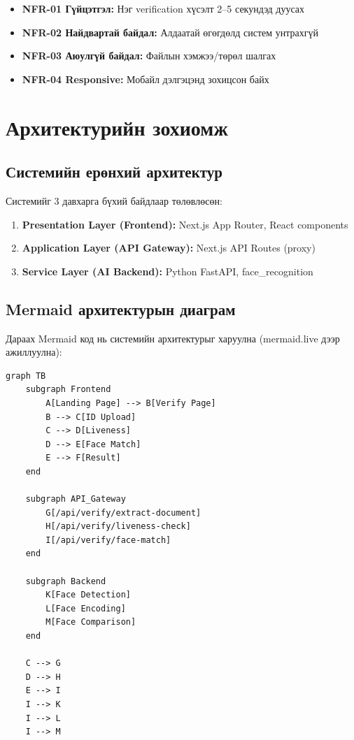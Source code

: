 \documentclass[12pt,a4paper]{article}
\begin{document}
\begin{itemize}[leftmargin=1cm]
  \item \textbf{NFR-01 Гүйцэтгэл:} Нэг verification хүсэлт 2--5 секундэд дуусах
  \item \textbf{NFR-02 Найдвартай байдал:} Алдаатай өгөгдөлд систем унтрахгүй
  \item \textbf{NFR-03 Аюулгүй байдал:} Файлын хэмжээ/төрөл шалгах
  \item \textbf{NFR-04 Responsive:} Мобайл дэлгэцэнд зохицсон байх
\end{itemize}

\section{Архитектурийн зохиомж}

\subsection{Системийн ерөнхий архитектур}

Системийг 3 давхарга бүхий байдлаар төлөвлөсөн:

\begin{enumerate}[leftmargin=1.2cm]
  \item \textbf{Presentation Layer (Frontend):} Next.js App Router, React components
  \item \textbf{Application Layer (API Gateway):} Next.js API Routes (proxy)
  \item \textbf{Service Layer (AI Backend):} Python FastAPI, face\_recognition
\end{enumerate}

\subsection{Mermaid архитектурын диаграм}

Дараах Mermaid код нь системийн архитектурыг харуулна (mermaid.live дээр ажиллуулна):

\begin{lstlisting}[caption={System Architecture (Mermaid)}]
graph TB
    subgraph Frontend
        A[Landing Page] --> B[Verify Page]
        B --> C[ID Upload]
        C --> D[Liveness]
        D --> E[Face Match]
        E --> F[Result]
    end
    
    subgraph API_Gateway
        G[/api/verify/extract-document]
        H[/api/verify/liveness-check]
        I[/api/verify/face-match]
    end
    
    subgraph Backend
        K[Face Detection]
        L[Face Encoding]
        M[Face Comparison]
    end
    
    C --> G
    D --> H
    E --> I
    I --> K
    I --> L
    I --> M
\end{lstlisting}
\end{document}
